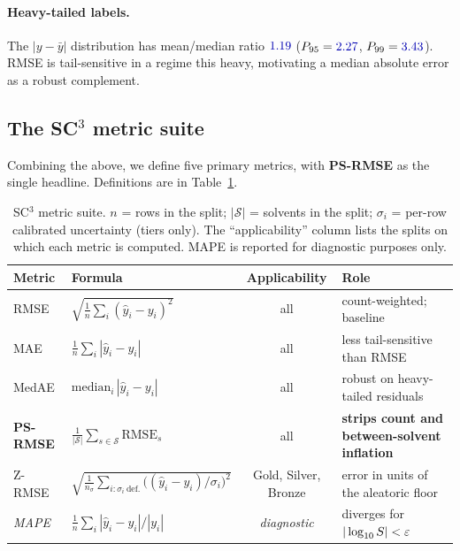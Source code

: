 \paragraph{Heavy-tailed labels.}
The $|y - \bar{y}|$ distribution has mean/median ratio
$\numval{1.19}$ ($P_{95} = \numval{2.27}$, $P_{99} =
\numval{3.43}$).  RMSE is tail-sensitive in a regime this heavy,
motivating a median absolute error as a robust complement.

\subsection{The SC$^3$ metric suite}
\label{sec:metric_suite}

Combining the above, we define five primary metrics, with
\textbf{PS-RMSE} as the single headline.  Definitions are in
Table~\ref{tab:metrics}.

\begin{table}[h]
\centering\small
\caption{SC$^{3}$ metric suite.  $n$ = rows in the split; $|\mathcal{S}|$
= solvents in the split; $\sigma_i$ = per-row calibrated uncertainty
(tiers only).  The ``applicability'' column lists the splits on which
each metric is computed.  MAPE is reported for diagnostic purposes only.}
\label{tab:metrics}
\begin{tabular}{@{}llcl@{}}
\toprule
Metric         & Formula & Applicability       & Role \\
\midrule
RMSE           & $\sqrt{\frac{1}{n}\sum_i (\hat y_i - y_i)^2}$
               & all
               & count-weighted; baseline \\[1pt]
MAE            & $\frac{1}{n}\sum_i |\hat y_i - y_i|$
               & all
               & less tail-sensitive than RMSE \\[1pt]
MedAE          & $\mathrm{median}_i\,|\hat y_i - y_i|$
               & all
               & robust on heavy-tailed residuals \\[1pt]
\textbf{PS-RMSE} & $\frac{1}{|\mathcal{S}|}\sum_{s\in\mathcal{S}}
                   \mathrm{RMSE}_s$
               & all
               & \textbf{strips count and between-solvent inflation} \\[1pt]
Z-RMSE         & $\sqrt{\frac{1}{n_\sigma}\sum_{i:\sigma_i\ \text{def.}}
                       \bigl((\hat y_i - y_i)/\sigma_i\bigr)^2}$
               & Gold, Silver, Bronze
               & error in units of the aleatoric floor \\[1pt]
\textit{MAPE}  & $\frac{1}{n}\sum_i |\hat y_i - y_i|/|y_i|$
               & \textit{diagnostic}
               & diverges for $|\log_{10} S| < \varepsilon$ \\
\bottomrule
\end{tabular}
\end{table}

